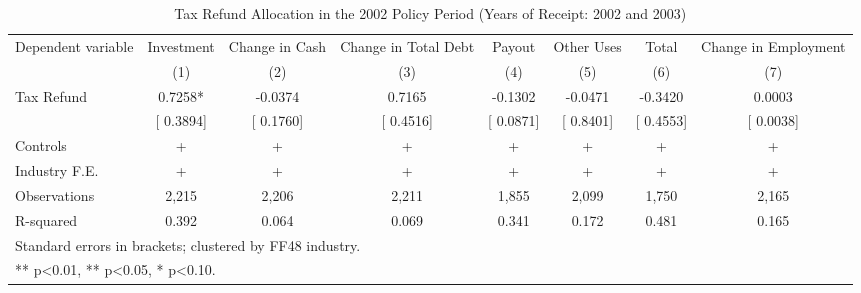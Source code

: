 \begin{table}[htbp]
\centering
\caption{Tax Refund Allocation in the 2002 Policy Period (Years of Receipt: 2002 and 2003)}
\begin{tabular}{lccccccc}
\hline\hline
Dependent variable & Investment & Change in Cash & Change in Total Debt & Payout & Other Uses & Total & Change in Employment \\
 & (1) & (2) & (3) & (4) & (5) & (6) & (7) \\
\hline
Tax Refund &    0.7258* &   -0.0374 &    0.7165 &   -0.1302 &   -0.0471 &   -0.3420 &    0.0003 \\
 & [   0.3894] & [   0.1760] & [   0.4516] & [   0.0871] & [   0.8401] & [   0.4553] & [   0.0038] \\
Controls & + & + & + & + & + & + & + \\
Industry F.E. & + & + & + & + & + & + & + \\
Observations &        2,215 &        2,206 &        2,211 &        1,855 &        2,099 &        1,750 &        2,165 \\
R-squared &  0.392 &  0.064 &  0.069 &  0.341 &  0.172 &  0.481 &  0.165 \\
\hline\hline
\multicolumn{8}{l}{\footnotesize Standard errors in brackets; clustered by FF48 industry.} \\
\multicolumn{8}{l}{\footnotesize *** p<0.01, ** p<0.05, * p<0.10.} \\
\end{tabular}
\end{table}
